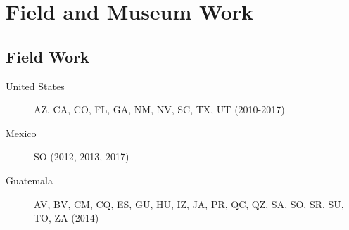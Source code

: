 \documentclass[12pt,a4paper]{article}
\begin{document}
\section*{Field and Museum Work}

	\subsection*{Field Work}
		\begin{description}
			\item [United States] \tabto*{3cm} AZ, CA, CO, FL, GA, NM, NV, SC, TX, UT (2010-2017)
			\item [Mexico] \tabto*{3cm} SO (2012, 2013, 2017)
			\item [Guatemala] \tabto*{3cm} AV, BV, CM, CQ, ES, GU, HU, IZ, JA, PR, QC, QZ, SA, SO, SR, SU, TO, ZA (2014)
		\end{description}
\end{document}
